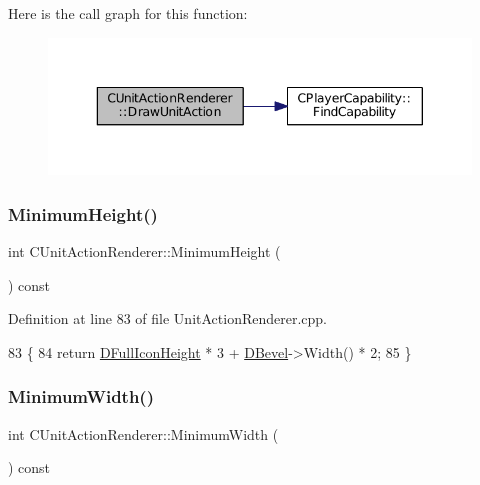 Here is the call graph for this function\+:\nopagebreak
\begin{figure}[H]
\begin{center}
\leavevmode
\includegraphics[width=343pt]{classCUnitActionRenderer_aef690a560f7dca2c2cf9051eb4f8d71f_cgraph}
\end{center}
\end{figure}
\hypertarget{classCUnitActionRenderer_aeec570f80477cd6a3d2ec832e686f442}{}\label{classCUnitActionRenderer_aeec570f80477cd6a3d2ec832e686f442} 
\subsubsection{\texorpdfstring{Minimum\+Height()}{MinimumHeight()}}
{\footnotesize\ttfamily int C\+Unit\+Action\+Renderer\+::\+Minimum\+Height (\begin{DoxyParamCaption}{ }\end{DoxyParamCaption}) const}



Definition at line 83 of file Unit\+Action\+Renderer.\+cpp.


\begin{DoxyCode}
83                                             \{
84     \textcolor{keywordflow}{return} \hyperlink{classCUnitActionRenderer_a11b30763b92ed0cbfb842f86fe76fe26}{DFullIconHeight} * 3 + \hyperlink{classCUnitActionRenderer_a3f4012557f7f4d71cfa02df725984ebb}{DBevel}->Width() * 2;
85 \}
\end{DoxyCode}
\hypertarget{classCUnitActionRenderer_ad2d078b041fce9c34264f4670a60c7a3}{}\label{classCUnitActionRenderer_ad2d078b041fce9c34264f4670a60c7a3} 
\subsubsection{\texorpdfstring{Minimum\+Width()}{MinimumWidth()}}
{\footnotesize\ttfamily int C\+Unit\+Action\+Renderer\+::\+Minimum\+Width (\begin{DoxyParamCaption}{ }\end{DoxyParamCaption}) const}



